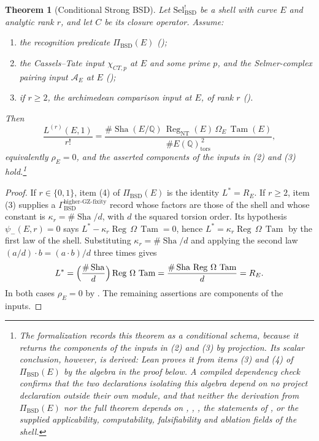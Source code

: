 \documentclass[11pt]{article}
\newtheorem{theorem}{Theorem}[section]
\theoremstyle{definition}
\newcommand{\Q}{\mathbb{Q}}
\newcommand{\Sha}{\operatorname{Sha}}
\newcommand{\Reg}{\operatorname{Reg}}
\newcommand{\Tam}{\operatorname{Tam}}
\newcommand{\tors}{\operatorname{tors}}
\newcommand{\kapr}{\kappa_r}
\newcommand{\SelBSD}{\mathrm{Sel}^{!}_{\mathrm{BSD}}}   \newcommand{\rhoE}{\rho_E}                              \newcommand{\PiBSD}{\Pi_{\mathrm{BSD}}}                 \newcommand{\GammaPD}{\Gamma_{\mathrm{BSD}}^{\mathrm{padic\text{-}descent}}}
\newcommand{\GammaGZ}{\Gamma_{\mathrm{BSD}}^{\mathrm{higher\text{-}GZ\text{-}fixity}}}
\newcommand{\chiCTp}{\chi_{CT,p}}                       \newcommand{\AofE}{\mathcal{A}_E}                        \newcommand{\etap}{\eta_p}                              \newcommand{\RefStable}{\mathbf{RefStable\,AOR}}
\begin{document}
\begin{theorem}[Conditional Strong BSD]\label{thm:closure:strong-bsd-conditional}
Let $\SelBSD$ be a shell with curve $E$ and analytic rank $r$, and let
$C$ be its closure operator.  Assume:
\begin{enumerate}
\item the recognition predicate $\PiBSD(E)$
  ();
\item the Cassels--Tate input $\chiCTp$ at $E$ and some prime $p$, and the
  Selmer-complex pairing input $\AofE$ at $E$
  ();
\item if $r\ge2$, the archimedean comparison input at $E$, of rank $r$
  ().
\end{enumerate}
Then
\[
  \frac{L^{(r)}(E,1)}{r!}
  =
  \frac{\#\Sha(E/\Q)\,\Reg_{\mathrm{NT}}(E)\,\Omega_E\,\Tam(E)}
       {\#E(\Q)_{\tors}^{\,2}},
\]
equivalently $\rhoE=0$, and the asserted components of the inputs in
(2) and (3) hold.\footnote{The formalization records this theorem as a conditional
schema, because it returns the components of the inputs in (2) and (3)
by projection.  Its scalar conclusion, however, is derived: Lean proves
it from items (3) and (4) of $\PiBSD(E)$ by the algebra in the proof
below.  A compiled dependency check confirms that the two declarations
isolating this algebra depend on no project declaration outside their
own module,
and that neither the derivation from $\PiBSD(E)$ nor the full theorem
depends on ,
, ,
the statements of , or the supplied applicability,
computability, falsifiability and ablation fields of the shell.}
\end{theorem}

\begin{proof}
If $r\in\{0,1\}$, item (4) of $\PiBSD(E)$ is the identity $L^*=R_E$.
If $r\ge2$, item (3) supplies a $\GammaGZ$ record whose factors are those
of the shell and whose constant is $\kapr=\#\Sha/d$, with $d$ the squared
torsion order.  Its hypothesis $\psi_-(E,r)=0$ says
$L^*-\kapr\Reg\,\Omega\,\Tam=0$, hence $L^*=\kapr\Reg\,\Omega\,\Tam$ by the
first law of the shell.  Substituting $\kapr=\#\Sha/d$ and applying the
second law $(a/d)\cdot b=(a\cdot b)/d$ three times gives
\[
  L^*
  =\Bigl(\frac{\#\Sha}{d}\Bigr)\Reg\,\Omega\,\Tam
  =\frac{\#\Sha\,\Reg\,\Omega\,\Tam}{d}
  =R_E .
\]
In both cases $\rhoE=0$ by .  The
remaining assertions are components of the inputs.
\end{proof}
\end{document}
